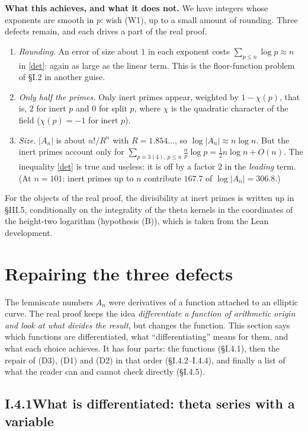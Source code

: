 \documentclass[11pt,letterpaper]{article}
\begin{document}
\textbf{What this achieves, and what it does not.} We have integers whose exponents are smooth in $p$:
wish (W1), up to a small amount of rounding. Three defects remain, and each drives a part of the real proof.
\begin{enumerate}[label=(D\arabic*),leftmargin=3em]
\item \emph{Rounding.} An error of size about $1$ in each exponent costs $\sum_{p\le n}\log p\approx n$ in \eqref{det}:
again as large as the linear term. This is the floor-function problem of \S I.2 in another guise.
\item \emph{Only half the primes.} Only inert primes appear, weighted by $1-\chi(p)$, that is, $2$ for inert $p$ and $0$ for split $p$, where $\chi$ is the
quadratic character of the field ($\chi(p)=-1$ for inert $p$).
\item \emph{Size.} $|A_n|$ is about $n!/R^n$ with $R=1.854\ldots$, so $\log|A_n|\approx n\log n$. But the
inert primes account only for $\sum_{p\equiv3(4),\,p\le n}\frac np\log p=\frac12n\log n+O(n)$. The inequality
\eqref{det} is true and useless: it is off by a factor $2$ in the \emph{leading} term.
(At $n=101$: inert primes up to $n$ contribute $167.7$ of $\log|A_n|=306.8$.)
\end{enumerate}
For the objects of the real proof, the divisibility at inert primes is written up in \S III.5, conditionally on the integrality of the theta kernels in the coordinates of the height-two logarithm (hypothesis (B)), which is taken from the Lean development.

\section{Repairing the three defects}

The lemniscate numbers $A_n$ were derivatives of a function attached to an elliptic curve. The real proof
keeps the idea \emph{differentiate a function of arithmetic origin and look at what divides the result},
but changes the function. This section says which functions are differentiated, what
``differentiating'' means for them, and what each choice achieves. It has four parts: the functions
(\S I.4.1), then the repair of (D3), (D1) and (D2) in that order (\S I.4.2--I.4.4), and finally a list of what
the reader can and cannot check directly (\S I.4.5).

\subsection*{I.4.1\quad What is differentiated: theta series with a variable}
\end{document}
